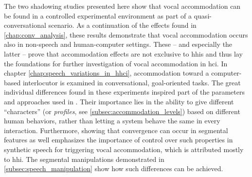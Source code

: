 The two shadowing studies presented here show that vocal accommodation can be found in a controlled experimental environment as part of a quasi-conversational scenario.
As a continuation of the effects found in \cref{chap:conv_analysis}, these results demonstrate that vocal accommodation occurs also in non-speech and human-computer settings.
These -- and especially the latter -- prove that accommodation effects are not exclusive to \acp{hhi} and thus lay the foundations for further investigation of vocal accommodation in \ac{hci}.
In chapter \cref{chap:speech_variations_in_hhci}, accommodation toward a computer-based interlocutor is examined in conversational, goal-oriented tasks.
The great individual differences found in these experiments inspired part of the parameters and approaches used in .
Their importance lies in the ability to give different \enquote{characters} (or \emph{profiles}, see \cref{subsec:accommodation_levels}) based on different human behaviors, rather than letting a system behave the same in every interaction.
Furthermore, showing that convergence can occur in segmental features as well emphasizes the importance of control over such properties in synthetic speech for triggering vocal accommodation, which is attributed mostly to \ac{hhi}.
The segmental manipulations demonstrated in \cref{subsec:speech_manipulation} show how such differences can be achieved.